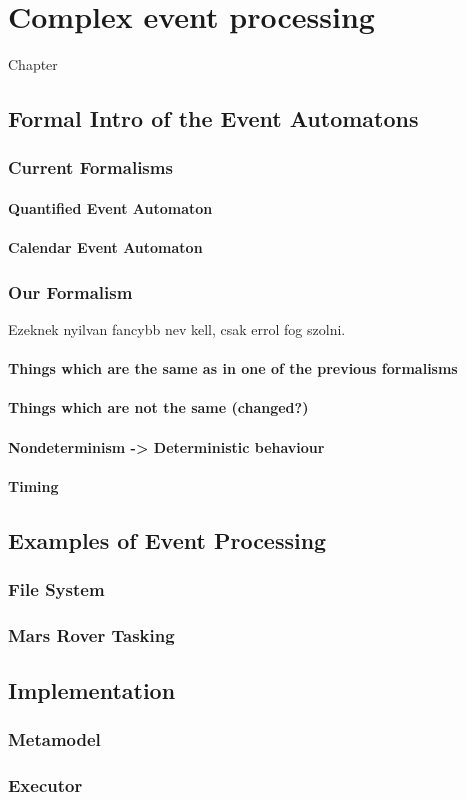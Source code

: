\chapter{Complex event processing}
\label{chap:cep}

Chapter
\section{Formal Intro of the Event Automatons}
	\subsection{Current Formalisms}
		\subsubsection{Quantified Event Automaton}
		\subsubsection{Calendar Event Automaton}
	\subsection{Our Formalism}
Ezeknek nyilvan fancybb nev kell, csak errol fog szolni.
		\subsubsection{Things which are the same as in one of the previous formalisms}
		\subsubsection{Things which are not the same (changed?)}
		\subsubsection{Nondeterminism -> Deterministic behaviour}
		\subsubsection{Timing}
\section{Examples of Event Processing}
	\subsection{File System}
	\subsection{Mars Rover Tasking}

\section{Implementation}
	\subsection{Metamodel}
	\subsection{Executor}

